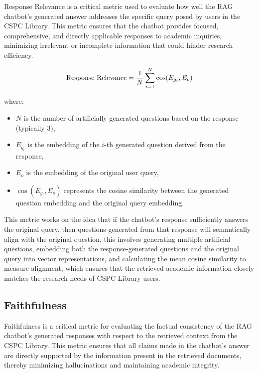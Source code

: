 \begin{refsection}
Response Relevance is a critical metric used to evaluate how well the RAG chatbot's generated answer addresses the specific query posed by users in the CSPC Library. This metric ensures that the chatbot provides focused, comprehensive, and directly applicable responses to academic inquiries, minimizing irrelevant or incomplete information that could hinder research efficiency.

\begin{equation}
\centering
\text{Response Relevance} = \frac{1}{N} \sum_{i=1}^{N} \cos(E_{g_i}, E_o)
\end{equation}

where:
\begin{itemize}
    \item $N$ is the number of artificially generated questions based on the response (typically 3),
    \item $E_{g_i}$ is the embedding of the $i$-th generated question derived from the response,
    \item $E_o$ is the embedding of the original user query,
    \item $\cos(E_{g_i}, E_o)$ represents the cosine similarity between the generated question embedding and the original query embedding.
\end{itemize}

This metric works on the idea that if the chatbot's response sufficiently answers the original query, then questions generated from that response will semantically align with the original question, this involves generating multiple artificial questions, embedding both the response-generated questions and the original query into vector representations, and calculating the mean cosine similarity to measure alignment, which ensures that the retrieved academic information closely matches the research needs of CSPC Library users.

\newpage
\clearpage
\subsection*{Faithfulness}

Faithfulness is a critical metric for evaluating the factual consistency of the RAG chatbot's generated responses with respect to the retrieved context from the CSPC Library. This metric ensures that all claims made in the chatbot's answer are directly supported by the information present in the retrieved documents, thereby minimizing hallucinations and maintaining academic integrity.


\end{refsection}
